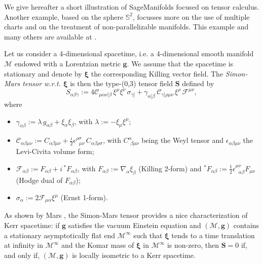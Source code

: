 \documentclass[a4paper]{jpconf}
\newcommand{\soft}[1]{\textsf{#1}}
\newcommand{\SM}{\soft{SageManifolds}}
\newcommand{\be}{\begin{equation}}
\newcommand{\ee}{\end{equation}}
\newcommand{\w}[1]{\bm{#1}}
\begin{document}
We give hereafter a short illustration of \SM{} focused on tensor 
calculus. Another example, based on the sphere $\mathbb{S}^2$, 
focusses more on the use of multiple charts and on the treatment of non-parallelizable 
manifolds. This example and many others are available at
\cite{SM_examples}.

Let us consider a 4-dimensional spacetime, i.e. a 4-dimensional smooth 
manifold $\mathcal{M}$ endowed with a Lorentzian metric $\w{g}$. 
We assume that the spacetime is stationary and denote by $\w{\xi}$ 
the corresponding Killing vector field. 
The \emph{Simon-Mars tensor w.r.t. $\w{\xi}$} is then
the type-(0,3) tensor field $\w{S}$ defined by \cite{Mars99}
\be \label{e:def_Simon-Mars}
S_{\alpha\beta\gamma} := 4 \mathcal{C}_{\mu\alpha\nu[\beta} \, \xi^\mu \xi^\nu \, \sigma_{\gamma]}
 + \gamma_{\alpha[\beta} \, \mathcal{C}_{\gamma]\rho\mu\nu} \, \xi^\rho \, \mathcal{F}^{\mu\nu} ,
\ee
where
\begin{itemize}
\item $\gamma_{\alpha\beta} := \lambda \, g_{\alpha\beta} + \xi_\alpha \xi_\beta$, 
with $\lambda := - \xi_\mu \xi^\mu$;
\item $\mathcal{C}_{\alpha\beta\mu\nu} := C_{\alpha\beta\mu\nu}
    + \frac{i}{2} \epsilon^{\rho\sigma}_{\ \ \, \mu\nu}\,  C_{\alpha\beta\rho\sigma} $,
with $C^\alpha_{\ \, \beta\mu\nu}$ being the Weyl tensor and 
$\epsilon_{\alpha\beta\mu\nu}$ the Levi-Civita volume form;
\item $\mathcal{F}_{\alpha\beta} := F_{\alpha\beta} + i\,  {}^*\!F_{\alpha\beta}$, 
with $F_{\alpha\beta} := \nabla_\alpha\xi_\beta$ (Killing 2-form) and 
${}^*\!F_{\alpha\beta} := \frac{1}{2} \epsilon^{\mu\nu}_{\ \ \, \alpha\beta} F_{\mu\nu}$
(Hodge dual of $F_{\alpha\beta}$);
\item $\sigma_\alpha := 2 \mathcal{F}_{\mu\alpha} \xi^\mu$ (Ernst 1-form).
\end{itemize}
As shown by Mars \cite{Mars99}, the 
Simon-Mars tensor provides a nice characterization of Kerr spacetime:
if $\w{g}$ satisfies the vacuum Einstein equation and $(\mathcal{M},\w{g})$
contains a stationary asymptotically flat end $\mathcal{M}^\infty$ such
that $\w{\xi}$ tends to a time translation at infinity in $\mathcal{M}^\infty$
and the Komar mass of $\w{\xi}$ in $\mathcal{M}^\infty$ is non-zero, then 
$\w{S} = 0$ if, and only if, $(\mathcal{M},\w{g})$ is locally isometric 
to a Kerr spacetime.
\end{document}
